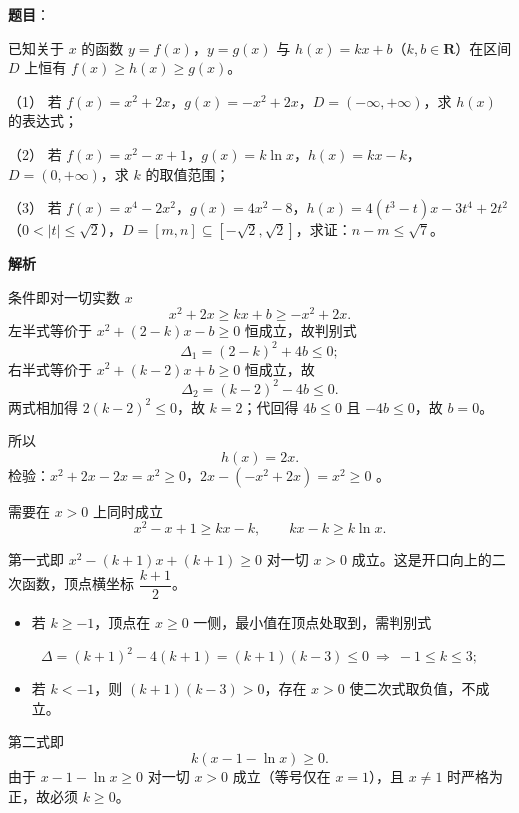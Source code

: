 \begin{answer}

\textbf{题目}：

已知关于 $x$ 的函数 $y=f(x)$，$y=g(x)$ 与 $h(x)=kx+b$（$k,b\in\mathbf R$）在区间 $D$ 上恒有 $f(x)\geqslant h(x)\geqslant g(x)$。

（1） 若 $f(x)=x^2+2x$，$g(x)=-x^2+2x$，$D=(-\infty,+\infty)$，求 $h(x)$ 的表达式；

（2） 若 $f(x)=x^2-x+1$，$g(x)=k\ln x$，$h(x)=kx-k$，$D=(0,+\infty)$，求 $k$ 的取值范围；

（3） 若 $f(x)=x^4-2x^2$，$g(x)=4x^2-8$，$h(x)=4(t^3-t)x-3t^4+2t^2$（$0<|t|\leqslant\sqrt2$），$D=[m,n]\subseteq[-\sqrt2,\sqrt2]$，求证：$n-m\leqslant\sqrt7$。

\textbf{解析}


条件即对一切实数 $x$
\nopagebreak[4]
\[x^2+2x\geqslant kx+b\geqslant -x^2+2x .\]
左半式等价于 $x^2+(2-k)x-b\geqslant0$ 恒成立，故判别式
\nopagebreak[4]
\[\Delta_1=(2-k)^2+4b\leqslant0 ;\]
右半式等价于 $x^2+(k-2)x+b\geqslant0$ 恒成立，故
\nopagebreak[4]
\[\Delta_2=(k-2)^2-4b\leqslant0 .\]
两式相加得 $2(k-2)^2\leqslant0$，故 $k=2$；代回得 $4b\leqslant0$ 且 $-4b\leqslant0$，故 $b=0$。

所以
\nopagebreak[4]
\[h(x)=2x .\]
检验：$x^2+2x-2x=x^2\geqslant0$，$2x-(-x^2+2x)=x^2\geqslant0$ 。


需要在 $x>0$ 上同时成立
\nopagebreak[4]
\[x^2-x+1\geqslant kx-k,\qquad kx-k\geqslant k\ln x .\]

第一式即 $x^2-(k+1)x+(k+1)\geqslant0$ 对一切 $x>0$ 成立。这是开口向上的二次函数，顶点横坐标 $\dfrac{k+1}2$。

\begin{itemize}
\item 若 $k\geqslant-1$，顶点在 $x\geqslant0$ 一侧，最小值在顶点处取到，需判别式
\end{itemize}
\nopagebreak[4]
\[\Delta=(k+1)^2-4(k+1)=(k+1)(k-3)\leqslant0\ \Longrightarrow\ -1\leqslant k\leqslant3 ;\]
\begin{itemize}
\item 若 $k<-1$，则 $(k+1)(k-3)>0$，存在 $x>0$ 使二次式取负值，不成立。
\end{itemize}

第二式即
\nopagebreak[4]
\[k\left(x-1-\ln x\right)\geqslant0 .\]
由于 $x-1-\ln x\geqslant0$ 对一切 $x>0$ 成立（等号仅在 $x=1$），且 $x\neq1$ 时严格为正，故必须 $k\geqslant0$。


\end{answer}
